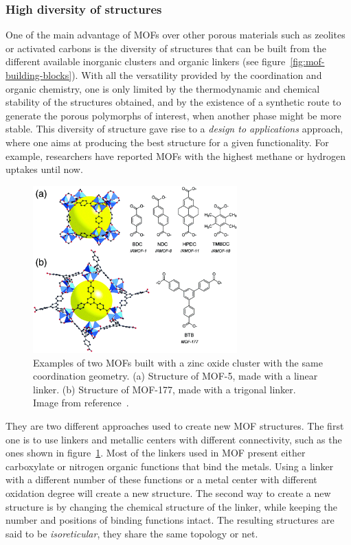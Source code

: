 \documentclass[thesis]{subfiles}
\begin{document}
\afterpage{\clearpage}

\subsubsection{High diversity of structures}

One of the main advantage of MOFs over other porous materials such as zeolites
or activated carbons is the diversity of structures that can be built from the
different available inorganic clusters and organic linkers (see
figure~\ref{fig:mof-building-blocks}). With all the versatility provided by the
coordination and organic chemistry, one is only limited by the thermodynamic and
chemical stability of the structures obtained, and by the existence of a
synthetic route to generate the porous polymorphs of interest, when another
phase might be more stable. This diversity of structure gave rise to a
\emph{design to applications} approach, where one aims at producing the best
structure for a given functionality. For example, researchers have reported MOFs
with the highest methane\cite{Tian2017} or hydrogen\cite{Oh2017} uptakes until
now.

\begin{figure}[ht]
    \centering
    \includegraphics[width=0.7\textwidth]{figures/cited/mof-different-linker}
    \caption{Examples of two MOFs built with a zinc oxide cluster with the same
    coordination geometry. (a) Structure of MOF-5, made with a linear linker.
    (b) Structure of MOF-177, made with a trigonal linker. Image from
    reference~\cite{Rowsell2004}.}
    \label{fig:mof-different-linkers}
\end{figure}

They are two different approaches used to create new MOF structures. The first
one is to use linkers and metallic centers with different connectivity, such as
the ones shown in figure~\ref{fig:mof-different-linkers}. Most of the linkers
used in MOF present either carboxylate or nitrogen organic functions that bind
the metals. Using a linker with a different number of these functions or a metal
center with different oxidation degree will create a new structure. The second
way to create a new structure is by changing the chemical structure of the
linker, while keeping the number and positions of binding functions intact. The
resulting structures are said to be \emph{isoreticular}, \ie they share the same
topology or net.
\end{document}
